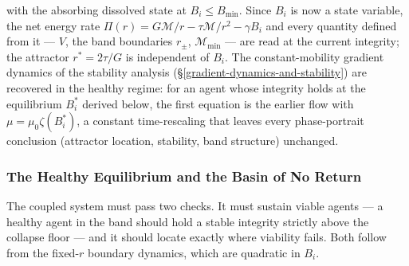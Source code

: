 \documentclass[11pt]{article}
\theoremstyle{plain}
\theoremstyle{definition}
\theoremstyle{remark}
\let\origsubsubsection\subsubsection
\renewcommand{\subsubsection}{\needspace{4\baselineskip}\origsubsubsection}
\begin{document}
with the absorbing dissolved state at \(B_i \leq B_{\min}\). Since
\(B_i\) is now a state variable, the net energy rate
\(\Pi(r) = G\mathcal{M}/r - \tau\mathcal{M}/r^2 - \gamma B_i\) and every
quantity defined from it --- \(V\), the band boundaries \(r_\pm\),
\(\mathcal{M}_{\min}\) --- are read at the current integrity; the
attractor \(r^* = 2\tau/G\) is independent of \(B_i\). The
constant-mobility gradient dynamics of the stability analysis
(§\ref{gradient-dynamics-and-stability}) are recovered in the healthy
regime: for an agent whose integrity holds at the equilibrium \(B_i^*\)
derived below, the first equation is the earlier flow with
\(\mu = \mu_0 \zeta(B_i^*)\), a constant time-rescaling that leaves
every phase-portrait conclusion (attractor location, stability, band
structure) unchanged.

\subsubsection{The Healthy Equilibrium and the Basin of No
Return}\label{the-healthy-equilibrium-and-the-basin-of-no-return}

The coupled system must pass two checks. It must sustain viable agents
--- a healthy agent in the band should hold a stable integrity strictly
above the collapse floor --- and it should locate exactly where
viability fails. Both follow from the fixed-\(r\) boundary dynamics,
which are quadratic in \(B_i\).
\end{document}

